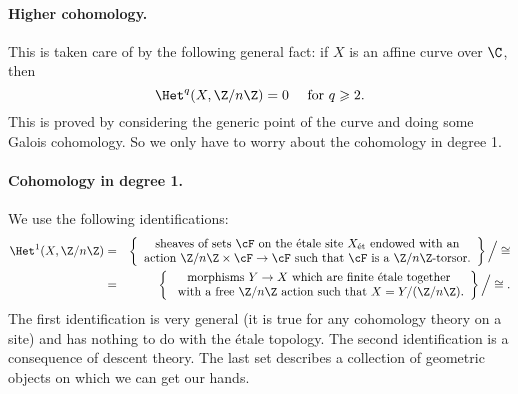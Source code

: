 \paragraph{Higher cohomology.} This is taken care of by the following general fact: if $X$ is an affine curve over $\C$, then 
$$
\Het^q (X, \Z/n\Z) = 0 \quad \text{ for } q \geqslant 2.
$$
This is proved by considering the generic point of the curve and doing some Galois cohomology. So we only have to worry about the cohomology in degree 1. 

\paragraph{Cohomology in degree 1.} We use the following identifications:
\begin{eqnarray*}
\Het^1 (X, \Z/n\Z) & = & \left\{
\begin{array}{c}
\text{sheaves of sets $\cF$ on the \'etale site $X_{\text{\'et}}$ endowed with an} \\
\text{action $\Z/n\Z \times \cF \to \cF$ such that $\cF$ is a $\Z/n\Z$-torsor.}
\end{array}
\right\}
\Big/ \cong 
\\
& = & \left\{
\begin{array}{c}
\text{morphisms $Y \to X$ which are finite \'etale together} \\
\text{ with a free $\Z/n\Z$ action such that $X = Y /(\Z/n\Z)$.}
\end{array}
\right\}
\Big/ \cong.
\end{eqnarray*}
The first identification is very general (it is true for any cohomology theory on a site) and has nothing to do with the \'etale topology. The second identification is a consequence of descent theory. The last set describes a collection of geometric objects on which we can get our hands.

